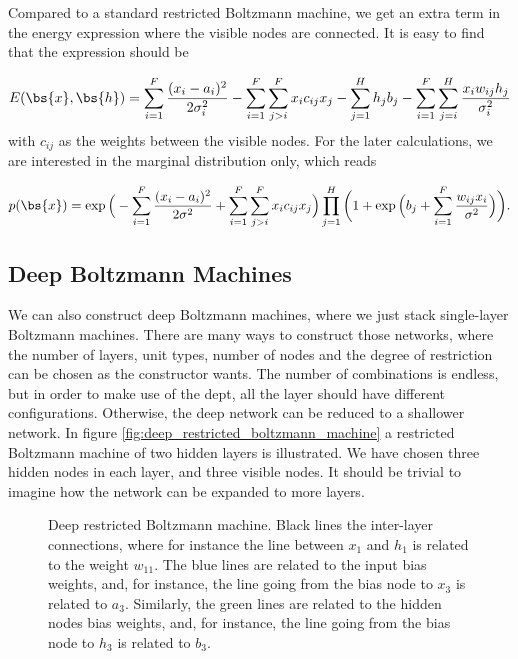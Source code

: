 Compared to a standard restricted Boltzmann machine, we get an extra term in the energy expression where the visible nodes are connected. It is easy to find that the expression should be

\begin{equation}
E(\bs{x},\bs{h})= \sum_{i=1}^F\frac{(x_i-a_i)^2}{2\sigma_i^2} - \sum_{i=1}^F\sum_{j>i}^Fx_ic_{ij}x_j- \sum_{j=1}^Hh_jb_j-\sum_{i=1}^F\sum_{j=i}^H \frac{x_iw_{ij}h_j}{\sigma_i^2} 
\label{eq:partlygaussianbinary}
\end{equation}
with $c_{ij}$ as the weights between the visible nodes. For the later calculations, we are interested in the marginal distribution only, which reads

\begin{equation}
p(\bs{x})=\exp\Big(-\sum_{i=1}^F\frac{(x_i-a_i)^2}{2\sigma^2}+\sum_{i=1}^F\sum_{j>i}^Fx_ic_{ij}x_j\Big)\prod_{j=1}^H\bigg(1+\exp\Big(b_j+\sum_{i=1}^F\frac{w_{ij}x_i}{\sigma^2}\Big)\bigg).
\label{eq:PRBMWF}
\end{equation}

\subsection{Deep Boltzmann Machines}
We can also construct deep Boltzmann machines, where we just stack single-layer Boltzmann machines. There are many ways to construct those networks, where the number of layers, unit types, number of nodes and the degree of restriction can be chosen as the constructor wants. The number of combinations is endless, but in order to make use of the dept, all the layer should have different configurations. Otherwise, the deep network can be reduced to a shallower network. In figure \eqref{fig:deep_restricted_boltzmann_machine} a restricted Boltzmann machine of two hidden layers is illustrated. We have chosen three hidden nodes in each layer, and three visible nodes. It should be trivial to imagine how the network can be expanded to more layers. 
\begin{figure} [H]
	\centering
	
	\caption{Deep restricted Boltzmann machine. Black lines the inter-layer connections, where for instance the line between $x_1$ and $h_1$ is related to the weight $w_{11}$. The blue lines are related to the input bias weights, and, for instance, the line going from the bias node to $x_3$ is related to $a_3$. Similarly, the green lines are related to the hidden nodes bias weights, and, for instance, the line going from the bias node to $h_3$ is related to $b_3$.}
	\label{fig:deep_restricted_boltzmann_machine}
\end{figure}

